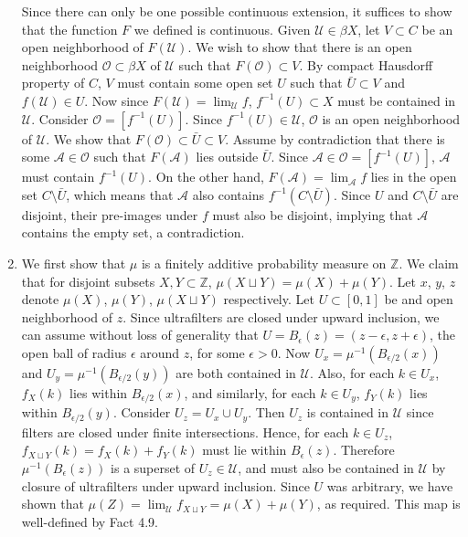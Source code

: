 \documentclass{article}
\begin{document}
\begin{enumerate}
    Since there can only be one possible continuous extension, it suffices
    to show that the function $F$ we defined is continuous. Given
    $\mathcal{U}\in\beta X$, let $V\subset C$ be an open neighborhood of
    $F(\mathcal{U})$. We wish to show that there is an open neighborhood
    $\mathcal{O}\subset\beta X$ of $\mathcal{U}$ such that
    $F(\mathcal{O})\subset V$. By compact Hausdorff property of $C$, $V$
    must contain some open set $U$ such that $\bar{U}\subset V$ and
    $f(\mathcal{U})\in U$. Now since $F(\mathcal{U})=\lim_{\mathcal{U}}f$,
    $f^{-1}(U)\subset X$ must be contained in $\mathcal{U}$. Consider
    $\mathcal{O}=[f^{-1}(U)]$. Since $f^{-1}(U)\in\mathcal{U}$,
    $\mathcal{O}$ is an open neighborhood of $\mathcal{U}$. We show that
    $F(\mathcal{O})\subset\bar{U}\subset V$. Assume by contradiction that
    there is some $\mathcal{A}\in\mathcal{O}$ such that $F(\mathcal{A})$
    lies outside $\bar{U}$. Since $\mathcal{A}\in\mathcal{O}=[f^{-1}(U)]$,
    $\mathcal{A}$ must contain $f^{-1}(U)$. On the other hand,
    $F(\mathcal{A})=\lim_{\mathcal{A}}f$ lies in the open set
    $C\setminus\bar{U}$, which means that $\mathcal{A}$ also contains
    $f^{-1}(C\setminus\bar{U})$. Since $U$ and $C\setminus\bar{U}$ are
    disjoint, their pre-images under $f$ must also be disjoint, implying
    that $\mathcal{A}$ contains the empty set, a contradiction.

  \item We first show that $\mu$ is a finitely additive probability
    measure on $\mathbb{Z}$. We claim that for disjoint subsets
    $X,Y\subset\mathbb{Z}$, $\mu(X\sqcup Y)=\mu(X)+\mu(Y)$. Let $x$, $y$,
    $z$ denote $\mu(X)$, $\mu(Y)$, $\mu(X\sqcup Y)$ respectively. Let
    $U\subset[0,1]$ be and open neighborhood of $z$. Since ultrafilters are
    closed under upward inclusion, we can assume without loss of generality
    that $U=B_\epsilon(z)=(z-\epsilon,z+\epsilon)$, the open ball of radius
    $\epsilon$ around $z$, for some $\epsilon>0$. Now
    $U_x=\mu^{-1}(B_{\epsilon/2}(x))$ and $U_y=\mu^{-1}(B_{\epsilon/2}(y))$
    are both contained in $\mathcal{U}$. Also, for each $k\in U_x$,
    $f_X(k)$ lies within $B_{\epsilon/2}(x)$, and similarly, for each $k\in
    U_y$, $f_Y(k)$ lies within $B_{\epsilon/2}(y)$. Consider $U_z=U_x\cup
    U_y$. Then $U_z$ is contained in $\mathcal{U}$ since filters are closed
    under finite intersections. Hence, for each $k\in U_z$, $f_{X\sqcup
    Y}(k)=f_X(k)+f_Y(k)$ must lie within $B_\epsilon(z)$. Therefore
    $\mu^{-1}(B_\epsilon(z))$ is a superset of $U_z\in\mathcal{U}$, and must
    also be contained in $\mathcal{U}$ by closure of ultrafilters under
    upward inclusion. Since $U$ was arbitrary, we have shown that
    $\mu(Z)=\lim_\mathcal{U}f_{X\sqcup Y}=\mu(X)+\mu(Y)$, as required. This
    map is well-defined by Fact 4.9. \\


\end{enumerate}
\end{document}
